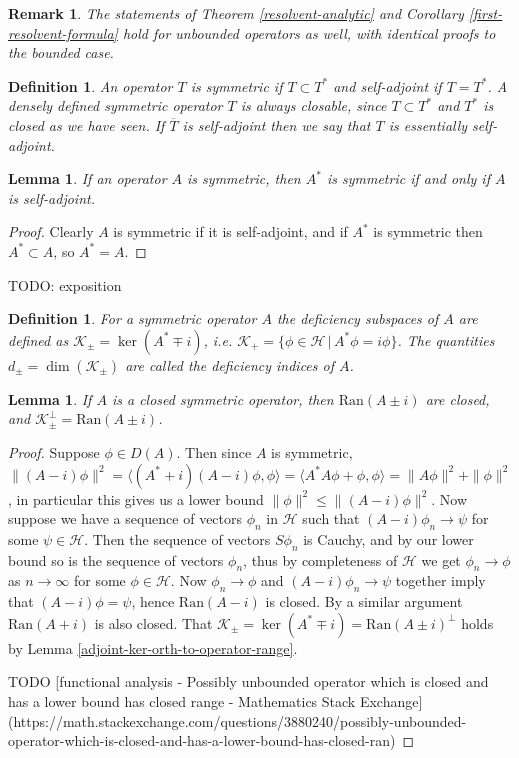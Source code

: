 \documentclass[12pt,oneside]{report}
\newtheorem{lem}[thm]{Lemma}
\newtheorem{defn}[thm]{Definition}
\newtheorem{rem}[thm]{Remark}
\begin{document}
\begin{rem}
    The statements of Theorem \ref{resolvent-analytic} and Corollary \ref{first-resolvent-formula} hold for unbounded operators as well, with identical proofs to the bounded case.
\end{rem}

\begin{defn}
    An operator $T$ is symmetric if $T \subset T^{*}$ and self-adjoint if $T = T^{*}$. A densely defined symmetric operator $T$ is always closable, since $T \subset T^{*}$ and $T^{*}$ is closed as we have seen. If $\overline{T}$ is self-adjoint then we say that $T$ is essentially self-adjoint.
\end{defn}

\begin{lem}
    If an operator $A$ is symmetric, then $A^{*}$ is symmetric if and only if $A$ is self-adjoint.
\end{lem}
\begin{proof}
    Clearly $A$ is symmetric if it is self-adjoint, and if $A^{*}$ is symmetric then $A^{*} \subset A$, so $A^{*} = A$.
\end{proof}

TODO: exposition

\begin{defn}
    For a symmetric operator $A$ the deficiency subspaces of $A$ are defined as $\mathscr{K}_{\pm} = \ker(A^{*}\mp i)$, i.e. $\mathscr{K}_{+} = \{ \phi \in \mathscr{H} \, | \, A^{*}\phi = i \phi \}$. The quantities $d_{\pm} = \dim(\mathscr{K}_{\pm})$ are called the deficiency indices of $A$.
\end{defn}

\begin{lem}
    If $A$ is a closed symmetric operator, then $\text{Ran}(A\pm i)$ are closed, and $\mathscr{K}_{\pm}^{\perp} = \text{Ran}(A\pm i)$.
\end{lem}
\begin{proof}
    Suppose $\phi \in D(A)$. Then since $A$ is symmetric, $\|(A - i)\phi\|^{2} = \langle (A^{*}+i)(A-i)\phi,\phi \rangle = \langle A^{*}A\phi + \phi, \phi \rangle = \|A\phi\|^{2} + \|\phi\|^{2}$, in particular this gives us a lower bound $\|\phi\|^{2} \leq \|(A-i)\phi\|^{2}$. Now suppose we have a sequence of vectors $\phi_{n}$ in $\mathscr{H}$ such that $(A-i)\phi_{n} \to \psi$ for some $\psi \in \mathscr{H}$. Then the sequence of vectors $S\phi_{n}$ is Cauchy, and by our lower bound so is the sequence of vectors $\phi_{n}$, thus by completeness of $\mathscr{H}$ we get $\phi_{n} \to \phi$ as $n \to \infty$ for some $\phi \in \mathscr{H}$. Now $\phi_{n} \to \phi$ and $(A-i)\phi_{n} \to \psi$ together imply that $(A-i)\phi = \psi$, hence $\text{Ran}(A-i)$ is closed. By a similar argument $\text{Ran}(A+i)$ is also closed. That $\mathscr{K}_{\pm} = \ker(A^{*}\mp i) = \text{Ran}(A \pm i)^{\perp}$ holds by Lemma \ref{adjoint-ker-orth-to-operator-range}.
    
    TODO [functional analysis - Possibly unbounded operator which is closed and has a lower bound has closed range - Mathematics Stack Exchange](https://math.stackexchange.com/questions/3880240/possibly-unbounded-operator-which-is-closed-and-has-a-lower-bound-has-closed-ran)
\end{proof}
\end{document}
